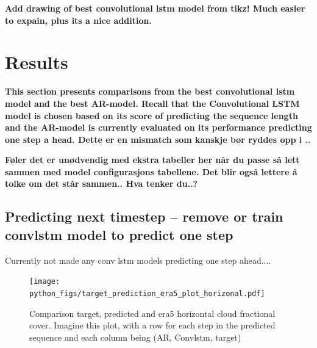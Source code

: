 \begin{table}[]
    \centering
    \caption{Configuration of traninable convolutional lstm models. \textbf{r2 er veldig merkelig foreløbig, includere mae?} TODO: Add list of model configurations which actually learn something.}
    \label{tab:convlstm_config}
\end{table}

\textbf{Add drawing of best convolutional lstm model from tikz! Much easier to expain, plus its a nice addition.}


\section{Results}
\textbf{This section presents comparisons from the best convolutional lstm model and the best AR-model. Recall that the Convolutional LSTM model is chosen based on its score of predicting the sequence length and the AR-model is currently evaluated on its performance predicting one step a head. \textbf{Dette er en mismatch som kanskje bør ryddes opp i ..}}

\textbf{Føler det er unødvendig med ekstra tabeller her når du passe så lett sammen med model configurasjons tabellene. Det blir også lettere å tolke om det står sammen.. Hva tenker du..? }

\subsection{Predicting next timestep -- remove or train convlstm model to predict one step}
Currently not made any conv lstm models predicting one step ahead....
\begin{figure}[ht]
    \centering
    \texttt{[image: python\_figs/target\_prediction\_era5\_plot\_horizonal.pdf]}
    \caption{Comparison target, predicted and era5 horizontal cloud fractional cover. Imagine this plot, with a row for each step in the predicted sequence and each column being (AR, Convlstm, target)}
    \label{fig:target_predict_era5_horizontal}
\end{figure}


